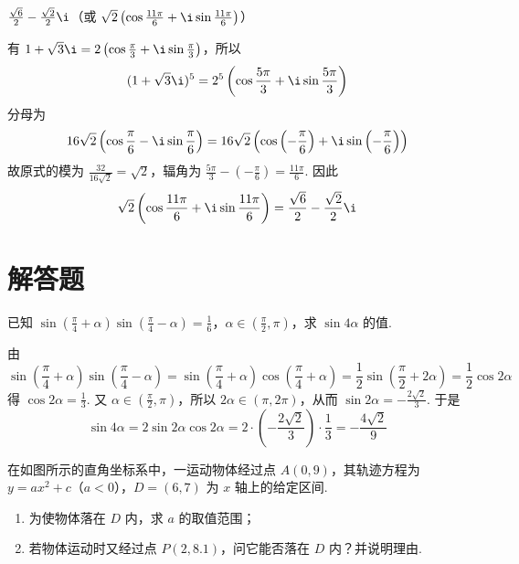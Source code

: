 \begin{answer}
\(\frac{\sqrt{6}}{2}-\frac{\sqrt{2}}{2}\i\)（或 \(\sqrt{2}\left(\cos \frac{11\pi}{6}+\i\sin \frac{11\pi}{6}\right)\)）
\end{answer}

\begin{solution}
有 \(1+\sqrt3\i=2\left(\cos\frac{\pi}{3}+\i\sin\frac{\pi}{3}\right)\)，所以
\[
(1+\sqrt3\i)^5=2^5\left(\cos\frac{5\pi}{3}+\i\sin\frac{5\pi}{3}\right)
\]
分母为
\[
16\sqrt2\left(\cos\frac{\pi}{6}-\i\sin\frac{\pi}{6}\right)
=16\sqrt2\left(\cos\left(-\frac\pi6\right)+\i\sin\left(-\frac\pi6\right)\right)
\]
故原式的模为 \(\frac{32}{16\sqrt2}=\sqrt2\)，辐角为 \(\frac{5\pi}{3}-\left(-\frac\pi6\right)=\frac{11\pi}{6}\). 因此
\[
\sqrt2\left(\cos\frac{11\pi}{6}+\i\sin\frac{11\pi}{6}\right)=\frac{\sqrt6}{2}-\frac{\sqrt2}{2}\i
\]
\end{solution}

\section{解答题}

\begin{problem}
已知 \(\sin\left(\frac{\pi}{4}+\alpha\right)\sin\left(\frac{\pi}{4}-\alpha\right)=\frac{1}{6}\)，\(\alpha\in\left(\frac{\pi}{2},\pi\right)\)，求 \(\sin 4\alpha\) 的值.
\end{problem}

\begin{solution}
由
\[
\sin\left(\frac{\pi}{4}+\alpha\right)\sin\left(\frac{\pi}{4}-\alpha\right)
=\sin\left(\frac{\pi}{4}+\alpha\right)\cos\left(\frac{\pi}{4}+\alpha\right)
=\frac{1}{2}\sin\left(\frac{\pi}{2}+2\alpha\right)
=\frac{1}{2}\cos2\alpha
\]
得 \(\cos2\alpha=\frac{1}{3}\). 又 \(\alpha\in\left(\frac{\pi}{2},\pi\right)\)，所以 \(2\alpha\in(\pi,2\pi)\)，从而
\(\sin2\alpha=-\frac{2\sqrt{2}}{3}\).
于是
\[
\sin4\alpha=2\sin2\alpha\cos2\alpha
=2\cdot\left(-\frac{2\sqrt{2}}{3}\right)\cdot\frac{1}{3}
=-\frac{4\sqrt{2}}{9}
\]
\end{solution}

\begin{problem}
在如图所示的直角坐标系中，一运动物体经过点 \(A(0,9)\)，其轨迹方程为 \(y=ax^{2}+c\)（\(a<0\)），\(D=(6,7)\) 为 \(x\) 轴上的给定区间.

\begin{enumerate}
\item 为使物体落在 \(D\) 内，求 \(a\) 的取值范围；
\item 若物体运动时又经过点 \(P(2,8.1)\)，问它能否落在 \(D\) 内？并说明理由.
\end{enumerate}

\end{problem}

